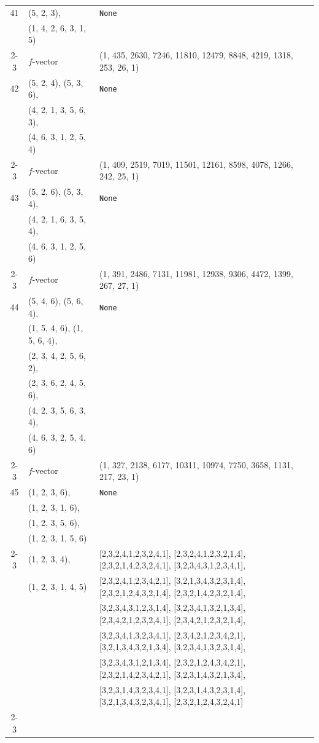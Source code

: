 \documentclass[10pt]{amsart}
\numberwithin{equation}{section}
\theoremstyle{plain}
\theoremstyle{definition}
\theoremstyle{remark}
\begin{document}
{\begin{longtable}{c|l|l}
		41 & (5, 2, 3), & \texttt{None} \\
		& (1, 4, 2, 6, 3, 1, 5) &  \\ \cline{2-3}
		
		& $f$-vector & {(1, 435, 2630, 7246, 11810, 12479, 8848, 4219, 1318, 253, 26, 1)} \\
		\midrule
		
		42 & (5, 2, 4), (5, 3, 6), & \texttt{None} \\
		& (4, 2, 1, 3, 5, 6, 3), &  \\
		& (4, 6, 3, 1, 2, 5, 4) &  \\ \cline{2-3}
		
		& $f$-vector & {(1, 409, 2519, 7019, 11501, 12161, 8598, 4078, 1266, 242, 25, 1)} \\
		\midrule
		
		43 & (5, 2, 6), (5, 3, 4), & \texttt{None} \\
		& (4, 2, 1, 6, 3, 5, 4), &  \\
		& (4, 6, 3, 1, 2, 5, 6) &  \\ \cline{2-3}
		
		& $f$-vector & {(1, 391, 2486, 7131, 11981, 12938, 9306, 4472, 1399, 267, 27, 1)} \\
		\midrule
		
		44 & (5, 4, 6), (5, 6, 4), & \texttt{None} \\
		& (1, 5, 4, 6), (1, 5, 6, 4), &  \\
		& (2, 3, 4, 2, 5, 6, 2), &  \\
		& (2, 3, 6, 2, 4, 5, 6), &  \\
		& (4, 2, 3, 5, 6, 3, 4), &  \\
		& (4, 6, 3, 2, 5, 4, 6) &  \\ \cline{2-3}
		
		& $f$-vector & {(1, 327, 2138, 6177, 10311, 10974, 7750, 3658, 1131, 217, 23, 1)} \\
		\midrule
		
		45 & (1, 2, 3, 6), & \texttt{None} \\
		& (1, 2, 3, 1, 6), &  \\
		& (1, 2, 3, 5, 6), &  \\
		& (1, 2, 3, 1, 5, 6) &  \\ \cline{2-3}
		
		& (1, 2, 3, 4), & [2,3,2,4,1,2,3,2,4,1], [2,3,2,4,1,2,3,2,1,4], [2,3,2,1,4,2,3,2,4,1], [3,2,3,4,3,1,2,3,4,1], \\
		& (1, 2, 3, 1, 4, 5) & [2,3,2,4,1,2,3,4,2,1], [3,2,1,3,4,3,2,3,1,4], [2,3,2,1,2,4,3,2,1,4], [2,3,2,1,4,2,3,2,1,4], \\
		&  & [3,2,3,4,3,1,2,3,1,4], [3,2,3,4,1,3,2,1,3,4], [2,3,4,2,1,2,3,2,4,1], [2,3,4,2,1,2,3,2,1,4], \\
		&  & [3,2,3,4,1,3,2,3,4,1], [2,3,4,2,1,2,3,4,2,1], [3,2,1,3,4,3,2,1,3,4], [3,2,3,4,1,3,2,3,1,4], \\
		&  & [3,2,3,4,3,1,2,1,3,4], [2,3,2,1,2,4,3,4,2,1], [2,3,2,1,4,2,3,4,2,1], [3,2,3,1,4,3,2,1,3,4], \\
		&  & [3,2,3,1,4,3,2,3,4,1], [3,2,3,1,4,3,2,3,1,4], [3,2,1,3,4,3,2,3,4,1], [2,3,2,1,2,4,3,2,4,1] \\ \cline{2-3}
		

\end{longtable}}
\end{document}
